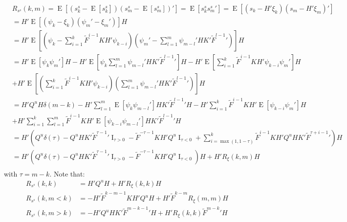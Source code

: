 \documentclass[oneside,12pt]{article}
\begin{document}
\begin{equation}\label{eq:smootherInAutoCov_comp}
    \begin{split}
        &R_{s^s}(k,m) = \operatorname{E}[(s^s_k - \operatorname{E}[s^s_k]) (s^s_m - \operatorname{E}[s^s_m])'] = \operatorname{E}[s^s_k s^s_m']
        = \operatorname{E}[(s_k - H'\xi_k) (s_m - H'\xi_m)']\\
        &= H'\operatorname{E}[(\psi_k - \xi_k) (\psi_m' - \xi_m')]H\\
        &= H'\operatorname{E}[(\psi_k - \sum_{i=1}^{k} \tilde{F}^{i-1} K H' \psi_{k-i}) (\psi_m' - \sum_{l=1}^{m} \psi_{m-l}' H K' \tilde{F}^{l-1}' )]H\\
        &=H'\operatorname{E}[\psi_k \psi_m']H 
        - H'\operatorname{E}[\psi_k \sum_{l=1}^{m} \psi_{m-l}' H K' \tilde{F}^{l-1}' ]H 
        - H'\operatorname{E}[\sum_{i=1}^{k} \tilde{F}^{i-1} K H' \psi_{k-i} \psi_m']H\\ 
        &+ H'\operatorname{E}[(\sum_{i=1}^{k} \tilde{F}^{i-1} K H' \psi_{k-i})(\sum_{l=1}^{m} \psi_{m-l}' H K' \tilde{F}^{l-1}')]H\\
        &=H' Q^u H \delta(m-k) 
        - H' \sum_{l=1}^{m} \operatorname{E}[ \psi_k \psi_{m-l}'] H K' \tilde{F}^{l-1}' H
        - H' \sum_{i=1}^{k} \tilde{F}^{i-1} K H' \operatorname{E}[ \psi_{k-i} \psi_m']H\\ 
        &+ H' \sum_{i=1}^{k} \sum_{l=1}^{m} \tilde{F}^{i-1} K H' \operatorname{E}[\psi_{k-i} \psi_{m-l}' ] H K' \tilde{F}^{l-1}' H\\
        &=H'\left( Q^u  \delta(\tau) 
        - Q^u  H K' \tilde{F}^{\tau-1}' \operatorname{I}_{\tau > 0}
        - \tilde{F}^{-\tau-1} K H' Q^u  \operatorname{I}_{\tau < 0} + \sum_{i=\operatorname{max}(1, 1-\tau)}^{k} \tilde{F}^{i-1} K H' Q^u H K' \tilde{F}^{\tau+i-1}' \right) H\\ 
        &=H'\left( Q^u  \delta(\tau) 
        - Q^u  H K' \tilde{F}^{\tau-1}' \operatorname{I}_{\tau > 0}
        - \tilde{F}^{-\tau-1} K H' Q^u  \operatorname{I}_{\tau < 0}\right) H + H' R_{\xi}(k,m) H\\ 
    \end{split}
\end{equation}
%
with $\tau = m-k$. Note that:
%
\begin{equation}\label{eq:smootherInAutoCovNoteThat_comp}
    \begin{split}
        R_{s^s}(k,k) &= H' Q^u H + H' R_{\xi}(k,k) H\\ 
        R_{s^s}(k,m < k) &=- H' \tilde{F}^{k-m-1} K H' Q^u H + H' \tilde{F}^{k-m} R_{\xi}(m,m) H\\ 
        R_{s^s}(k,m>k) &=- H' Q^u  H K' \tilde{F}^{m-k-1}'H + H' R_{\xi}(k,k) \tilde{F}^{m-k}' H\\ 
    \end{split}
\end{equation}
\end{document}
